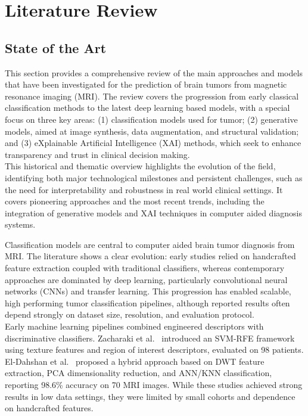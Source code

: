 \chapter{Literature Review}

\section{State of the Art}

This section provides a comprehensive review of the main approaches and models that have been investigated for the prediction of brain tumors from magnetic resonance imaging (MRI). The review covers the progression from early classical classification methods to the latest deep learning based models, with a special focus on three key areas: (1) classification models used for tumor; (2) generative models, aimed at image synthesis, data augmentation, and structural validation; and (3) eXplainable Artificial Intelligence (XAI) methods, which seek to enhance transparency and trust in clinical decision making.\\

This historical and thematic overview highlights the evolution of the field, identifying both major technological milestones and persistent challenges, such as the need for interpretability and robustness in real world clinical settings. It covers pioneering approaches and the most recent trends, including the integration of generative models and XAI techniques in computer aided diagnosis systems.


Classification models are central to computer aided brain tumor diagnosis from MRI. The literature shows a clear evolution: early studies relied on handcrafted feature extraction coupled with traditional classifiers, whereas contemporary approaches are dominated by deep learning, particularly convolutional neural networks (CNNs) and transfer learning. This progression has enabled scalable, high performing tumor classification pipelines, although reported results often depend strongly on dataset size, resolution, and evaluation protocol.\\

Early machine learning pipelines combined engineered descriptors with discriminative classifiers. Zacharaki et al.~\cite{5193232} introduced an SVM-RFE framework using texture features and region of interest descriptors, evaluated on 98 patients. El-Dahshan et al.~\cite{ELDAHSHAN2010433} proposed a hybrid approach based on DWT feature extraction, PCA dimensionality reduction, and ANN/KNN classification, reporting 98.6\% accuracy on 70 MRI images. While these studies achieved strong results in low data settings, they were limited by small cohorts and dependence on handcrafted features.\\

